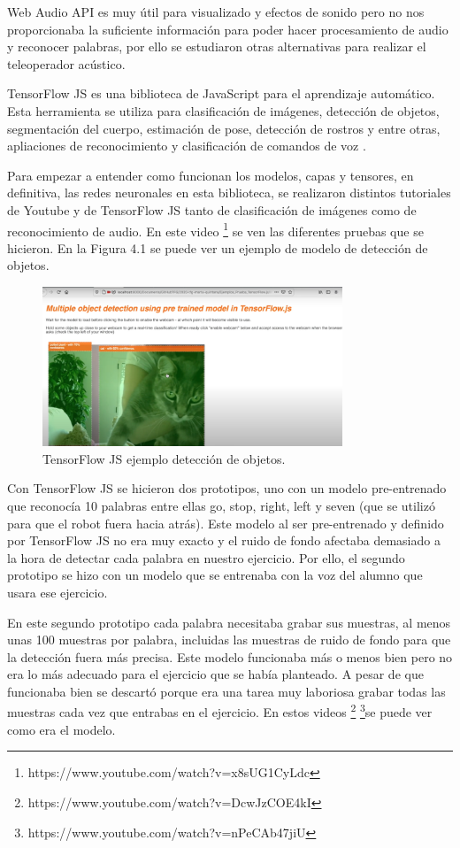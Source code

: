 Web Audio API es muy útil para visualizado y efectos de sonido pero no nos proporcionaba la suficiente información para poder hacer procesamiento de audio y reconocer palabras, por ello se estudiaron otras alternativas para realizar el teleoperador acústico. 

TensorFlow JS es una biblioteca de JavaScript para el aprendizaje automático. Esta herramienta se utiliza para clasificación de imágenes, detección de objetos, segmentación del cuerpo, estimación de pose, detección de rostros y entre otras, apliaciones de reconocimiento y clasificación de comandos de voz \cite{tensorflowmodel}.

Para empezar a entender como funcionan los modelos, capas y  tensores, en definitiva,  las redes neuronales en esta biblioteca, se realizaron distintos tutoriales de Youtube y de TensorFlow JS tanto de clasificación de imágenes como de reconocimiento de audio. En este video \footnote{https://www.youtube.com/watch?v=x8sUG1CyLdc} se ven las diferentes pruebas que se hicieron. En la Figura 4.1 se puede ver un ejemplo de modelo de detección de objetos.

\begin{figure}[H]
    \centering
    \includegraphics[width=0.8\textwidth, height=0.4\textwidth]{chapters/images/imagerecognition.png}
    \caption{TensorFlow JS ejemplo detección de objetos. }
    \label{fig:my_label}
\end{figure}

Con TensorFlow JS se hicieron dos prototipos, uno con un modelo pre-entrenado que reconocía 10 palabras entre ellas go, stop, right, left y seven (que se utilizó para que el robot fuera hacia atrás).
Este modelo al ser pre-entrenado y definido por TensorFlow JS no era muy exacto y el ruido de fondo afectaba demasiado a la hora de detectar cada palabra en nuestro ejercicio. Por ello, el segundo prototipo se hizo con un modelo que se entrenaba con la voz del alumno que usara ese ejercicio.

En este segundo prototipo cada palabra necesitaba grabar sus muestras, al menos unas 100 muestras por palabra, incluidas las muestras de ruido de fondo para que la detección fuera más precisa. Este modelo funcionaba más o menos bien pero no era lo más adecuado para el ejercicio que se había planteado. A pesar de que funcionaba bien se descartó porque era una tarea muy laboriosa grabar todas las muestras cada vez que entrabas en el ejercicio. 
En estos videos \footnote{https://www.youtube.com/watch?v=DcwJzCOE4kI}
\footnote{https://www.youtube.com/watch?v=nPeCAb47jiU}se puede ver  como era el modelo.

